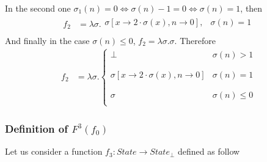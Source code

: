 \documentclass{article}
\begin{document}
In the second one $\sigma_1(n) = 0 \iff \sigma(n)-1 = 0 \iff \sigma(n) = 1$, then
\begin{align*}
f_2  &= \lambda \sigma . \left.
\begin{array}{ll}
      \sigma[x\rightarrow 2 \cdot \sigma(x), n \rightarrow 0], & \sigma(n) = 1 \\
\end{array} 
\right.
\end{align*}
And finally in the case $\sigma(n) \leq 0$, $f_2 = \lambda \sigma . \sigma$. Therefore \\
\begin{align}
f_2 &= \lambda \sigma . \left\{
\begin{array}{ll}
      \perp & \sigma(n) > 1 \\
      \\ \\
      \sigma[x\rightarrow 2 \cdot \sigma(x), n \rightarrow 0] & \sigma(n) = 1 \\
      \\ \\
      \sigma & \sigma(n) \leq 0 \\
\end{array} 
\right.
\end{align}
\subsubsection*{Definition of $F^3(f_0)$}
Let us consider a function $f_3: State \longrightarrow State_{\perp}$ defined as follow
\end{document}
